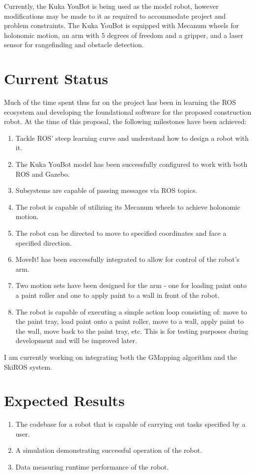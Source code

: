 \documentclass[12pt]{article}
\begin{document}
    Currently, the Kuka YouBot is being used as the model robot, however modifications may be made to it as required to accommodate project and problem constraints. The Kuka YouBot is equipped with Mecanum wheels for holonomic motion, an arm with $5$ degrees of freedom and a gripper, and a laser sensor for rangefinding and obstacle detection.

    \section{Current Status}
    Much of the time spent thus far on the project has been in learning the ROS ecosystem and developing the foundational software for the proposed construction robot. At the time of this proposal, the following milestones have been achieved:
    \begin{enumerate}
        \item Tackle ROS' steep learning curve and understand how to design a robot with it.
        \item The Kuka YouBot model has been successfully configured to work with both ROS and Gazebo.
        \item Subsystems are capable of passing messages via ROS topics.
        \item The robot is capable of utilizing its Mecanum wheels to achieve holonomic motion.
        \item The robot can be directed to move to specified coordinates and face a specified direction.
        \item MoveIt! has been successfully integrated to allow for control of the robot's arm.
        \item Two motion sets have been designed for the arm - one for loading paint onto a paint roller and one to apply paint to a wall in front of the robot.
        \item The robot is capable of executing a simple action loop consisting of: move to the paint tray, load paint onto a paint roller, move to a wall, apply paint to the wall, move back to the paint tray, etc. This is for testing purposes during development and will be improved later.
    \end{enumerate}
    I am currently working on integrating both the GMapping algorithm and the SkiROS system.

    \section{Expected Results}
    \begin{enumerate}
        \item The codebase for a robot that is capable of carrying out tasks specified by a user.
        \item A simulation demonstrating successful operation of the robot.
        \item Data measuring runtime performance of the robot.
    \end{enumerate}

    \printbibliography
\end{document}
